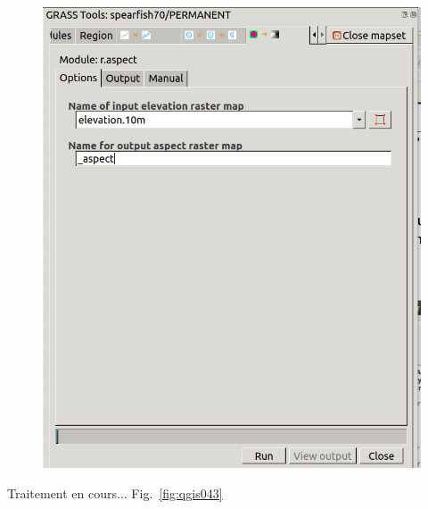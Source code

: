 \begin{figure}[htbp]
   \centering
   \includegraphics[scale=0.3]{qgis042.png}
   \caption{}
   \label{fig:qgis042}
\end{figure}

Traitement en cours... Fig.~\ref{fig:qgis043}

